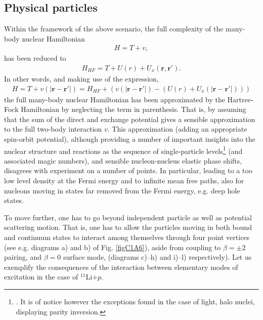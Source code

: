 \subsection{Physical particles}\label{sect1.9.2}
Within the framework of the above scenario, the full complexity of the many-body nuclear Hamiltonian
\begin{align}
H=T+v,
\end{align}
has been reduced to
\begin{align}
H_{HF}=T+U(r)+U_x(\mathbf r,\mathbf r').
\end{align}
In other words, and making use of the expression,
\begin{align}\label{eq1.9.7}
H=T+v(|\mathbf r- \mathbf r'|)=H_{HF}+\left(v(|\mathbf r- \mathbf r'|)-(U(r)+U_x(|\mathbf r- \mathbf r'|))\right)
\end{align}
the full many-body nuclear Hamiltonian has been approximated by the Hartree-Fock Hamiltonian
by neglecting the term in parenthesis. That is, by assuming that the sum of the direct and exchange potential gives a sensible approximation to the full two-body interaction $v$. This approximation (adding an appropriate spin-orbit potential), although providing a number of important insights into the nuclear structure and reactions as the sequence of single-particle levels\footnote{\cite{Mayer:55}. It is of notice however the exceptions found in the case of light, halo nuclei, displaying parity inversion.} (and associated magic numbers), and sensible nucleon-nucleus elastic phase shifts, disagrees with experiment on a number of points. In particular, leading to a too low level density at the Fermi energy and to  infinite mean free paths, also for nucleons moving in states far removed from the Fermi energy, e.g. deep hole states. 

To move further, one has to go beyond independent particle as well as  potential scattering motion. That is, one has  to allow the particles moving in both bound and continuum states to interact among themselves through four point vertices (see e.g.  diagrams a) and b) of Fig. \ref{figC1A6}), aside from coupling to $\beta=\pm2$ pairing, and $\beta=0$ surface mode, (diagrams c)--h) and i)--l) respectively). 
Let us exemplify the consequences of the interaction between  elementary modes of excitation in the case of $^{11}$Li$+p$.
